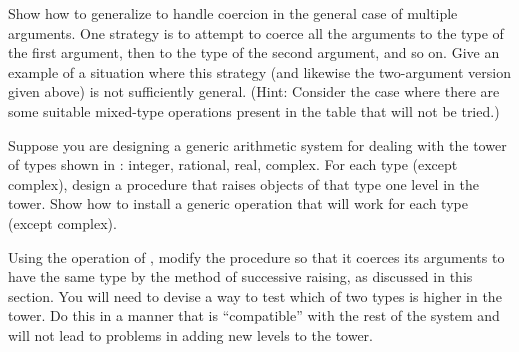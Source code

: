 \begin{exerciseGroup}
\begin{enumerate}[a.]
\end{enumerate}

\label{Exercise 2.82}
 Show how to generalize
 to handle coercion in the general case of multiple
arguments.  One strategy is to attempt to coerce all the arguments to the type
of the first argument, then to the type of the second argument, and so on.
Give an example of a situation where this strategy (and likewise the
two-argument version given above) is not sufficiently general.  (Hint: Consider
the case where there are some suitable mixed-type operations present in the
table that will not be tried.)

\label{Exercise 2.83}
 Suppose you are designing a
generic arithmetic system for dealing with the tower of types shown in
: integer, rational, real, complex.  For each type (except
complex), design a procedure that raises objects of that type one level in the
tower.  Show how to install a generic  operation that will work for
each type (except complex).

\label{Exercise 2.84}
 Using the  operation
of , modify the  procedure so that it
coerces its arguments to have the same type by the method of successive
raising, as discussed in this section.  You will need to devise a way to test
which of two types is higher in the tower.  Do this in a manner that is
``compatible'' with the rest of the system and will not lead to problems in
adding new levels to the tower.


\end{exerciseGroup}
